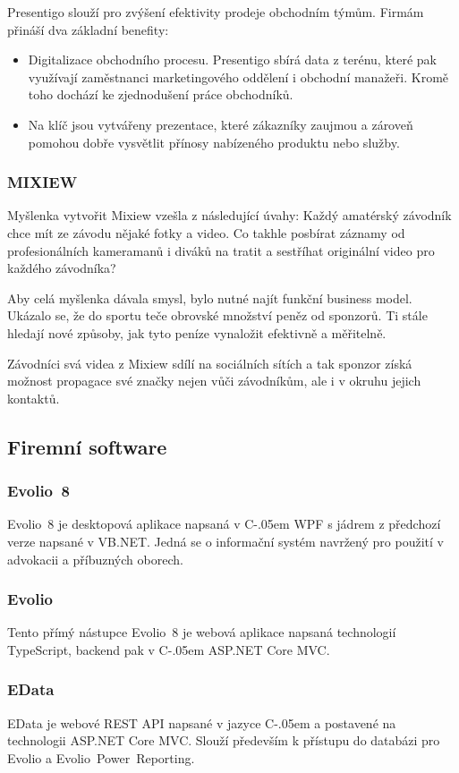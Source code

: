 \documentclass[czech,bachelor,dept460,male,csharp]{diploma}
\newcommand{\EvolioEight}{Evolio~8}
\newcommand{\EFilters}{Evolio~Power~Reporting}
\newcommand{\EvolioX}{Evolio}
\newcommand{\EData}{EData}
\newcommand{\Csharp}{%
  {\settoheight{\dimen0}{C}C\kern-.05em \resizebox{!}{\dimen0}{\raisebox{\depth}{\#}}}}
\begin{document}
		Presentigo slouží pro zvýšení efektivity prodeje obchodním týmům. Firmám přináší dva základní benefity:
		\begin{itemize}
			\item
			Digitalizace obchodního procesu. Presentigo sbírá data z terénu, které pak využívají zaměstnanci marketingového oddělení i obchodní manažeři. Kromě toho dochází ke zjednodušení práce obchodníků.
			\item
			Na klíč jsou vytvářeny prezentace, které zákazníky zaujmou a zároveň pomohou dobře vysvětlit přínosy nabízeného produktu nebo služby.
		\end{itemize}

 		\subsubsection{MIXIEW}
 		Myšlenka vytvořit Mixiew vzešla z následující úvahy: Každý amatérský závodník chce mít ze závodu nějaké fotky a video. Co takhle posbírat záznamy od profesionálních kameramanů i diváků na tratit a sestříhat originální video pro každého závodníka?

		Aby celá myšlenka dávala smysl, bylo nutné najít funkční business model. Ukázalo se, že do sportu teče obrovské množství peněz od sponzorů. Ti stále hledají nové způsoby, jak tyto peníze vynaložit efektivně a měřitelně.

		Závodníci svá videa z Mixiew sdílí na sociálních sítích a tak sponzor získá možnost propagace své značky nejen vůči závodníkům, ale i v okruhu jejich kontaktů.
	\subsection{Firemní software}
		\subsubsection{\EvolioEight}
		{\EvolioEight} je desktopová aplikace napsaná v {\Csharp} WPF s jádrem z předchozí verze napsané v VB.NET. Jedná se o informační systém navržený pro použití v advokacii a příbuzných oborech. 
		\subsubsection{\EvolioX}
		Tento přímý nástupce {\EvolioEight} je webová aplikace napsaná technologií TypeScript, backend pak v {\Csharp} ASP.NET Core MVC.
		\subsubsection{\EData}
		{\EData} je webové REST API napsané v jazyce {\Csharp} a postavené na technologii ASP.NET Core MVC.
		Slouží především k přístupu do databázi pro {\EvolioX} a {\EFilters}.
\end{document}
